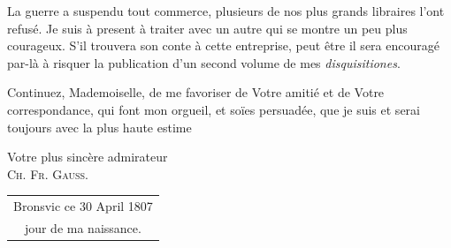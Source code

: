 La guerre a suspendu tout commerce, plusieurs de nos plus grands libraires
l’ont refusé. Je suis à present à traiter avec un autre qui se montre un peu
plus courageux. S’il trouvera son conte à cette entreprise, peut être il sera
encouragé par-là à risquer la publication d’un second volume de mes \textit{disquisitiones}.

Continuez, Mademoiselle, de me favoriser de Votre amitié et de Votre
correspondance, qui font mon orgueil, et soïes persuadée, que je suis et serai
toujours avec la plus haute estime
\begin{flushright}
Votre plus sincère admirateur\\
\textsc{Ch. Fr. Gauss.}
\end{flushright}
\noindent\begin{tabular}{c}Bronsvic ce 30 April 1807\\jour de ma naissance.\end{tabular}
\ClosingRule
